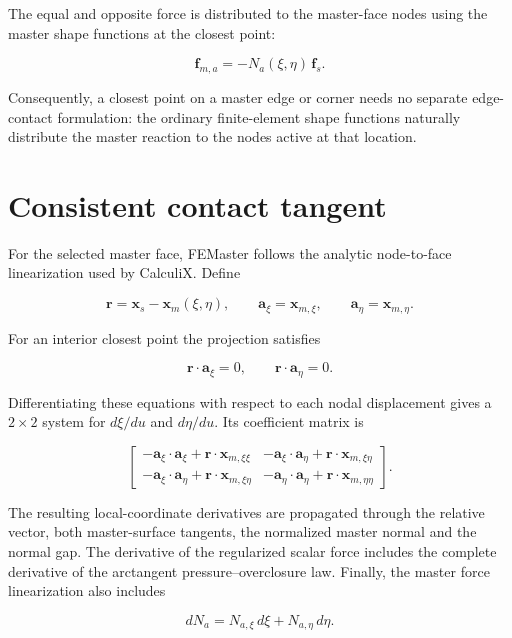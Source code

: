 The equal and opposite force is distributed to the master-face nodes using the master shape functions at the closest point:

\[
    \mathbf{f}_{m,a} = -N_a(\xi,\eta)\,\mathbf{f}_s.
\]

Consequently, a closest point on a master edge or corner needs no separate edge-contact formulation: the ordinary finite-element shape functions naturally distribute the master reaction to the nodes active at that location.

\section{Consistent contact tangent}

For the selected master face, FEMaster follows the analytic node-to-face linearization used by CalculiX. Define

\[
    \mathbf{r}=\mathbf{x}_s-\mathbf{x}_m(\xi,\eta),
    \qquad
    \mathbf{a}_\xi=\mathbf{x}_{m,\xi},
    \qquad
    \mathbf{a}_\eta=\mathbf{x}_{m,\eta}.
\]

For an interior closest point the projection satisfies

\[
    \mathbf{r}\cdot\mathbf{a}_\xi=0,
    \qquad
    \mathbf{r}\cdot\mathbf{a}_\eta=0.
\]

Differentiating these equations with respect to each nodal displacement gives a \(2\times2\) system for \(d\xi/du\) and \(d\eta/du\). Its coefficient matrix is

\[
    \begin{bmatrix}
        -\mathbf{a}_\xi\cdot\mathbf{a}_\xi
        +\mathbf{r}\cdot\mathbf{x}_{m,\xi\xi}
        &
        -\mathbf{a}_\xi\cdot\mathbf{a}_\eta
        +\mathbf{r}\cdot\mathbf{x}_{m,\xi\eta}
        \\
        -\mathbf{a}_\xi\cdot\mathbf{a}_\eta
        +\mathbf{r}\cdot\mathbf{x}_{m,\xi\eta}
        &
        -\mathbf{a}_\eta\cdot\mathbf{a}_\eta
        +\mathbf{r}\cdot\mathbf{x}_{m,\eta\eta}
    \end{bmatrix}.
\]

The resulting local-coordinate derivatives are propagated through the relative vector, both master-surface tangents, the normalized master normal and the normal gap. The derivative of the regularized scalar force includes the complete derivative of the arctangent pressure--overclosure law. Finally, the master force linearization also includes

\[
    dN_a=N_{a,\xi}\,d\xi+N_{a,\eta}\,d\eta.
\]

